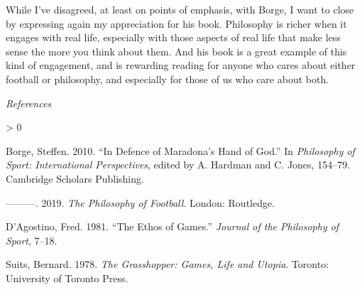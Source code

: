 \documentclass[
  12pt,
]{article}
\newlength{\cslhangindent}
\newenvironment{CSLReferences}[2] %
 {%
  \setlength{\parindent}{0pt}
  \ifodd #1 \everypar{\setlength{\hangindent}{\cslhangindent}}\ignorespaces\fi
  \ifnum #2 > 0
  \setlength{\parskip}{#2\baselineskip}
  \fi
 }%
 {}
\begin{document}
While I've disagreed, at least on points of emphasis, with Borge, I want to close by expressing again my appreciation for his book. Philosophy is richer when it engages with real life, especially with those aspects of real life that make less sense the more you think about them. And his book is a great example of this kind of engagement, and is rewarding reading for anyone who cares about either football or philosophy, and especially for those of us who care about both.

\emph{References}

\hypertarget{refs}{}
\begin{CSLReferences}{1}{0}
\leavevmode\hypertarget{ref-Borge2010}{}%
Borge, Steffen. 2010. {``In Defence of Maradona's Hand of God.''} In \emph{Philosophy of Sport: International Perspectives}, edited by A. Hardman and C. Jones, 154--79. Cambridge Scholars Publishing.

\leavevmode\hypertarget{ref-Borge2019}{}%
---------. 2019. \emph{The Philosophy of Football}. London: Routledge.

\leavevmode\hypertarget{ref-DAgostino1981}{}%
D'Agostino, Fred. 1981. {``The Ethos of Games.''} \emph{Journal of the Philosophy of Sport}, 7--18.

\leavevmode\hypertarget{ref-Suits1978}{}%
Suits, Bernard. 1978. \emph{The Grasshopper: Games, Life and Utopia}. Toronto: University of Toronto Press.

\end{CSLReferences}
\end{document}
